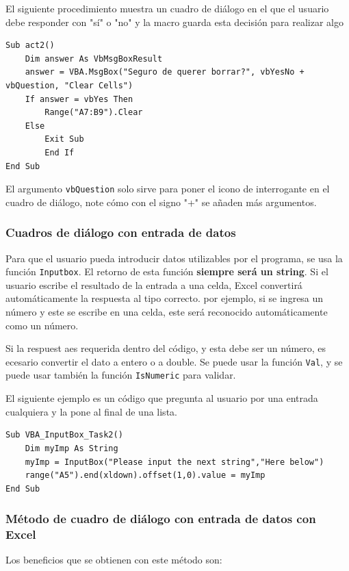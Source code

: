 El siguiente procedimiento muestra un cuadro de diálogo en el que el usuario debe responder con "sí" o "no" y la macro guarda esta decisión para realizar algo

\begin{verbatim}
Sub act2()
    Dim answer As VbMsgBoxResult
    answer = VBA.MsgBox("Seguro de querer borrar?", vbYesNo + vbQuestion, "Clear Cells")
    If answer = vbYes Then
        Range("A7:B9").Clear
    Else
        Exit Sub
        End If
End Sub
\end{verbatim}

El argumento \texttt{vbQuestion} solo sirve para poner el icono de interrogante en el cuadro de diálogo, note cómo con el signo "+" se añaden más argumentos.

\subsubsection{Cuadros de diálogo con entrada de datos}

Para que el usuario pueda introducir datos utilizables por el programa, se usa la función \texttt{Inputbox}. El retorno de esta función \textbf{siempre será un string}. Si el usuario escribe el resultado de la entrada a una celda, Excel convertirá automáticamente la respuesta al tipo correcto. por ejemplo, si se ingresa un número y este se escribe en una celda, este será reconocido automáticamente como un número.

Si la respuest aes requerida dentro del código, y esta debe ser un número, es ecesario convertir el dato a entero o a double. Se puede usar la función \texttt{Val}, y se puede usar también la función \texttt{IsNumeric} para validar. 

El siguiente ejemplo es un código que pregunta al usuario por una entrada cualquiera y la pone al final de una lista.

\begin{verbatim}
Sub VBA_InputBox_Task2()
    Dim myImp As String
    myImp = InputBox("Please input the next string","Here below")
    range("A5").end(xldown).offset(1,0).value = myImp
End Sub
\end{verbatim}

\subsubsection{Método de cuadro de diálogo con entrada de datos con Excel}

Los beneficios que se obtienen con este método son:

